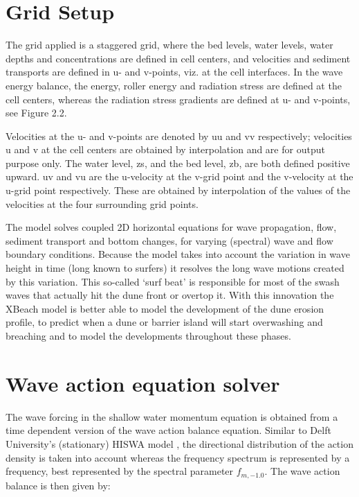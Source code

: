 \section{ Grid Setup}

The grid applied is a staggered grid, where the bed levels, water levels, water depths and concentrations are defined in cell centers, and velocities and sediment transports are defined in u- and v-points, viz. at the cell interfaces. In the wave energy balance, the energy, roller energy and radiation stress are defined at the cell centers, whereas the radiation stress gradients are defined at u- and v-points, see Figure 2.2.

Velocities at the u- and v-points are denoted by uu and vv respectively; velocities u and v at the cell centers are obtained by interpolation and are for output purpose only. The water level, zs, and the bed level, zb, are both defined positive upward. uv and vu are the u-velocity at the v-grid point and the v-velocity at the u-grid point respectively. These are obtained by interpolation of the values of the velocities at the four surrounding grid points. 

The model solves coupled 2D horizontal equations for wave propagation, flow, sediment transport and bottom changes, for varying (spectral) wave and flow boundary conditions. Because the model takes into account the variation in wave height in time (long known to surfers) it resolves the long wave motions created by this variation. This so-called `surf beat' is responsible for most of the swash waves that actually hit the dune front or overtop it. With this innovation the XBeach model is better able to model the development of the dune erosion profile, to predict when a dune or barrier island will start overwashing and breaching and to model the developments throughout these phases.

\section{ Wave action equation solver}

The wave forcing in the shallow water momentum equation is obtained from a time dependent version of the wave action balance equation. Similar to Delft University's (stationary) HISWA model \citep{Holthuijsen1989}, the directional distribution of the action density is taken into account whereas the frequency spectrum is represented by a frequency, best represented by the spectral parameter $f_{m,-1.0}$. The wave action balance is then given by:

